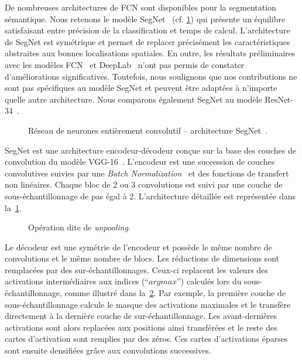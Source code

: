 
De nombreuses architectures de \gls{FCN} sont disponibles pour la segmentation sémantique. Nous retenons le modèle SegNet~\cite{badrinarayanan_segnet_2017} (cf. \cref{fig:segnet}) qui présente un équilibre satisfaisant entre précision de la classification et temps de calcul. L'architecture de SegNet est symétrique et permet de replacer précisément les caractéristiques abstraites aux bonnes localisations spatiales. En outre, les résultats préliminaires avec les modèles \gls{FCN}~\cite{long_fully_2015} et DeepLab~\cite{l._c._chen_deeplab_2018} n'ont pas permis de constater d'améliorations significatives. Toutefois, nous soulignons que nos contributions ne sont pas spécifiques au modèle SegNet et peuvent être adaptées à n'importe quelle autre architecture. Nous comparons également SegNet au modèle ResNet-34~\cite{he_deep_2016}.

\begin{figure}
	\resizebox{\textwidth}{!}{%
	
	}
	\caption[Réseau de neurones entièrement convolutif -- architecture SegNet.]{Réseau de neurones entièrement convolutif -- architecture SegNet~\cite{badrinarayanan_segnet_2017}.}
	\label{fig:segnet}
\end{figure}

SegNet est une architecture encodeur-décodeur conçue sur la base des couches de convolution du modèle VGG-16~\cite{chatfield_return_2014,simonyan_very_2014}. L'encodeur est une succession de couches convolutives suivies par une \emph{Batch Normalization}~\cite{ioffe_batch_2015} et des fonctions de transfert non linéaires. Chaque bloc de 2 ou 3 convolutions est suivi par une couche de sous-échantillonnage de pas égal à 2. L'architecture détaillée est représentée dans la~\cref{fig:segnet}.

\begin{figure}

\caption{Opération dite de \emph{unpooling}.}
\label{fig:unpooling}
\end{figure}

Le décodeur est une symétrie de l'encodeur et possède le même nombre de convolutions et le même nombre de blocs. Les réductions de dimensions sont remplacées par des sur-échantillonnages. Ceux-ci replacent les valeurs des activations intermédiaires aux indices (``$argmax$'') calculés lors du sous-échantillonnage, comme illustré dans la~\cref{fig:unpooling}. Par exemple, la première couche de sous-échantillonnage calcule le masque des activations maximales et le transfère directement à la dernière couche de sur-échantillonnage. Les avant-dernières activations sont alors replacées aux positions ainsi transférées et le reste des cartes d'activation sont remplies par des zéros. Ces cartes d'activations éparses sont ensuite densifiées grâce aux convolutions successives.


